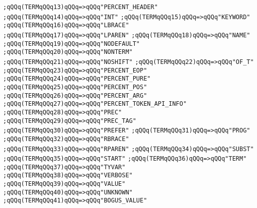 \verb|;qQQq(TERMqQQq13)qQQq=>qQQq"PERCENT_HEADER"|\newline
\verb|;qQQq(TERMqQQq14)qQQq=>qQQq"INT"|\newline
\verb|;qQQq(TERMqQQq15)qQQq=>qQQq"KEYWORD"|\newline
\verb|;qQQq(TERMqQQq16)qQQq=>qQQq"LBRACE"|\newline
\verb|;qQQq(TERMqQQq17)qQQq=>qQQq"LPAREN"|\newline
\verb|;qQQq(TERMqQQq18)qQQq=>qQQq"NAME"|\newline
\verb|;qQQq(TERMqQQq19)qQQq=>qQQq"NODEFAULT"|\newline
\verb|;qQQq(TERMqQQq20)qQQq=>qQQq"NONTERM"|\newline
\verb|;qQQq(TERMqQQq21)qQQq=>qQQq"NOSHIFT"|\newline
\verb|;qQQq(TERMqQQq22)qQQq=>qQQq"OF_T"|\newline
\verb|;qQQq(TERMqQQq23)qQQq=>qQQq"PERCENT_EOP"|\newline
\verb|;qQQq(TERMqQQq24)qQQq=>qQQq"PERCENT_PURE"|\newline
\verb|;qQQq(TERMqQQq25)qQQq=>qQQq"PERCENT_POS"|\newline
\verb|;qQQq(TERMqQQq26)qQQq=>qQQq"PERCENT_ARG"|\newline
\verb|;qQQq(TERMqQQq27)qQQq=>qQQq"PERCENT_TOKEN_API_INFO"|\newline
\verb|;qQQq(TERMqQQq28)qQQq=>qQQq"PREC"|\newline
\verb|;qQQq(TERMqQQq29)qQQq=>qQQq"PREC_TAG"|\newline
\verb|;qQQq(TERMqQQq30)qQQq=>qQQq"PREFER"|\newline
\verb|;qQQq(TERMqQQq31)qQQq=>qQQq"PROG"|\newline
\verb|;qQQq(TERMqQQq32)qQQq=>qQQq"RBRACE"|\newline
\verb|;qQQq(TERMqQQq33)qQQq=>qQQq"RPAREN"|\newline
\verb|;qQQq(TERMqQQq34)qQQq=>qQQq"SUBST"|\newline
\verb|;qQQq(TERMqQQq35)qQQq=>qQQq"START"|\newline
\verb|;qQQq(TERMqQQq36)qQQq=>qQQq"TERM"|\newline
\verb|;qQQq(TERMqQQq37)qQQq=>qQQq"TYVAR"|\newline
\verb|;qQQq(TERMqQQq38)qQQq=>qQQq"VERBOSE"|\newline
\verb|;qQQq(TERMqQQq39)qQQq=>qQQq"VALUE"|\newline
\verb|;qQQq(TERMqQQq40)qQQq=>qQQq"UNKNOWN"|\newline
\verb|;qQQq(TERMqQQq41)qQQq=>qQQq"BOGUS_VALUE"|\newline
